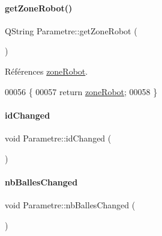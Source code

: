 \paragraph{\texorpdfstring{get\+Zone\+Robot()}{getZoneRobot()}}
{\footnotesize\ttfamily Q\+String Parametre\+::get\+Zone\+Robot (\begin{DoxyParamCaption}{ }\end{DoxyParamCaption})}



Références \hyperlink{class_parametre_a85c2e24c35cad5304b5e2edf7289c9c3}{zone\+Robot}.


\begin{DoxyCode}
00056 \{
00057     \textcolor{keywordflow}{return} \hyperlink{class_parametre_a85c2e24c35cad5304b5e2edf7289c9c3}{zoneRobot};
00058 \}
\end{DoxyCode}
\mbox{\label{class_parametre_aa76741724dcb92c1cd57f239d094aa01}} 
\paragraph{\texorpdfstring{id\+Changed}{idChanged}}
{\footnotesize\ttfamily void Parametre\+::id\+Changed (\begin{DoxyParamCaption}{ }\end{DoxyParamCaption})\hspace{0.3cm}{\ttfamily [signal]}}

\mbox{\label{class_parametre_a7563d0a38151759c9f302a8a2d6c7f83}} 
\paragraph{\texorpdfstring{nb\+Balles\+Changed}{nbBallesChanged}}
{\footnotesize\ttfamily void Parametre\+::nb\+Balles\+Changed (\begin{DoxyParamCaption}{ }\end{DoxyParamCaption})\hspace{0.3cm}{\ttfamily [signal]}}

\mbox{\label{class_parametre_a57903e139fdcc9d22d310616a3d3e7cf}} 
